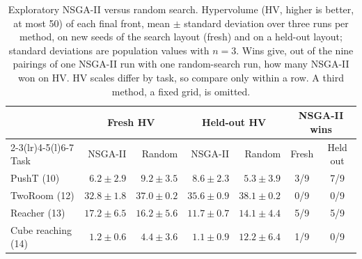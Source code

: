 \begin{table}[htbp]
\caption{Exploratory NSGA-II versus random search. Hypervolume (HV, higher is better, at
most 50) of each final front, mean $\pm$ standard deviation over three runs per method,
on new seeds of the search layout (fresh) and on a held-out layout; standard deviations
are population values with $n=3$. Wins give, out of the nine pairings of one NSGA-II run
with one random-search run, how many NSGA-II won on HV. HV scales differ
by task, so compare only within a row. A third method, a fixed grid, is omitted.}
\label{tab:evo-history}\centering\small
\begin{tabular}{@{}lrrrrcc@{}}
\toprule
 & \multicolumn{2}{c}{Fresh HV} & \multicolumn{2}{c}{Held-out HV} & \multicolumn{2}{c}{NSGA-II wins} \\
\cmidrule(lr){2-3}\cmidrule(lr){4-5}\cmidrule(l){6-7}
Task & NSGA-II & Random & NSGA-II & Random & Fresh & Held out \\
\midrule
PushT (10) & $6.2\pm2.9$ & $9.2\pm3.5$ & $8.6\pm2.3$ & $5.3\pm3.9$ & 3/9 & 7/9 \\
TwoRoom (12) & $32.8\pm1.8$ & $37.0\pm0.2$ & $35.6\pm0.9$ & $38.1\pm0.2$ & 0/9 & 0/9 \\
Reacher (13) & $17.2\pm6.5$ & $16.2\pm5.6$ & $11.7\pm0.7$ & $14.1\pm4.4$ & 5/9 & 5/9 \\
Cube reaching (14) & $1.2\pm0.6$ & $4.4\pm3.6$ & $1.1\pm0.9$ & $12.2\pm6.4$ & 1/9 & 0/9 \\
\bottomrule
\end{tabular}
\end{table}

